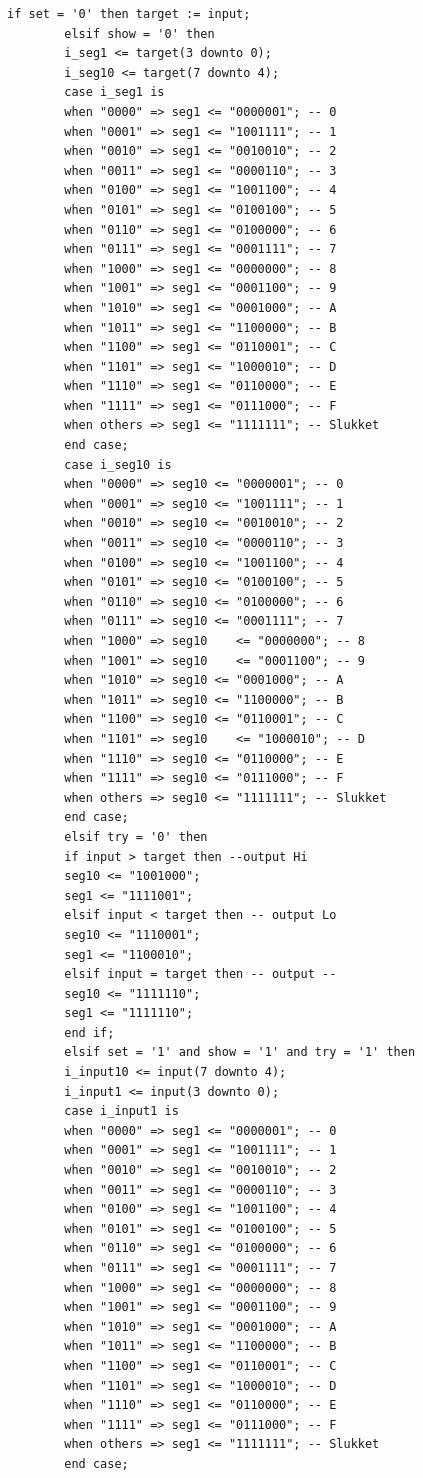 \begin{enumerate}
\begin{lstlisting}[caption={Behavioral style kode for Guessgame},label={lst:Guessgame2pl}]
		if set = '0' then target := input;
		elsif show = '0' then 
		i_seg1 <= target(3 downto 0);
		i_seg10 <= target(7 downto 4);
		case i_seg1 is
		when "0000" => seg1 <= "0000001"; -- 0
		when "0001" => seg1 <= "1001111"; -- 1
		when "0010" => seg1 <= "0010010"; -- 2
		when "0011" => seg1 <= "0000110"; -- 3
		when "0100" => seg1 <= "1001100"; -- 4
		when "0101" => seg1 <= "0100100"; -- 5
		when "0110" => seg1 <= "0100000"; -- 6
		when "0111" => seg1 <= "0001111"; -- 7
		when "1000" => seg1 <= "0000000"; -- 8
		when "1001" => seg1 <= "0001100"; -- 9
		when "1010" => seg1 <= "0001000"; -- A
		when "1011" => seg1 <= "1100000"; -- B
		when "1100" => seg1 <= "0110001"; -- C
		when "1101" => seg1 <= "1000010"; -- D
		when "1110" => seg1 <= "0110000"; -- E
		when "1111" => seg1 <= "0111000"; -- F
		when others => seg1 <= "1111111"; -- Slukket
		end case;
		case i_seg10 is
		when "0000" => seg10 <= "0000001"; -- 0
		when "0001" => seg10 <= "1001111"; -- 1
		when "0010" => seg10 <= "0010010"; -- 2
		when "0011" => seg10 <= "0000110"; -- 3
		when "0100" => seg10 <= "1001100"; -- 4
		when "0101" => seg10 <= "0100100"; -- 5
		when "0110" => seg10 <= "0100000"; -- 6
		when "0111" => seg10 <= "0001111"; -- 7
		when "1000" => seg10	<= "0000000"; -- 8
		when "1001" => seg10	<= "0001100"; -- 9
		when "1010" => seg10 <= "0001000"; -- A
		when "1011" => seg10 <= "1100000"; -- B
		when "1100" => seg10 <= "0110001"; -- C
		when "1101" => seg10	<= "1000010"; -- D
		when "1110" => seg10 <= "0110000"; -- E
		when "1111" => seg10 <= "0111000"; -- F
		when others => seg10 <= "1111111"; -- Slukket
		end case;
		elsif try = '0' then 
		if input > target then --output Hi
		seg10 <= "1001000"; 
		seg1 <= "1111001";
		elsif input < target then -- output Lo
		seg10 <= "1110001"; 
		seg1 <= "1100010";
		elsif input = target then -- output --
		seg10 <= "1111110"; 
		seg1 <= "1111110";
		end if;
		elsif set = '1' and show = '1' and try = '1' then 
		i_input10 <= input(7 downto 4); 
		i_input1 <= input(3 downto 0);
		case i_input1 is
		when "0000" => seg1 <= "0000001"; -- 0
		when "0001" => seg1 <= "1001111"; -- 1
		when "0010" => seg1 <= "0010010"; -- 2
		when "0011" => seg1 <= "0000110"; -- 3
		when "0100" => seg1 <= "1001100"; -- 4
		when "0101" => seg1 <= "0100100"; -- 5
		when "0110" => seg1 <= "0100000"; -- 6
		when "0111" => seg1 <= "0001111"; -- 7
		when "1000" => seg1 <= "0000000"; -- 8
		when "1001" => seg1 <= "0001100"; -- 9
		when "1010" => seg1 <= "0001000"; -- A
		when "1011" => seg1 <= "1100000"; -- B
		when "1100" => seg1 <= "0110001"; -- C
		when "1101" => seg1 <= "1000010"; -- D
		when "1110" => seg1 <= "0110000"; -- E
		when "1111" => seg1 <= "0111000"; -- F
		when others => seg1 <= "1111111"; -- Slukket
		end case;
		

\end{lstlisting}
\end{enumerate}
